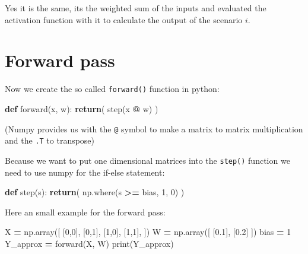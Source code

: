 \documentclass[
]{book}
\newenvironment{Shaded}{\begin{snugshade}}{\end{snugshade}}
\newcommand{\BuiltInTok}[1]{#1}
\newcommand{\ControlFlowTok}[1]{\textcolor[rgb]{0.13,0.29,0.53}{\textbf{#1}}}
\newcommand{\DecValTok}[1]{\textcolor[rgb]{0.00,0.00,0.81}{#1}}
\newcommand{\FloatTok}[1]{\textcolor[rgb]{0.00,0.00,0.81}{#1}}
\newcommand{\KeywordTok}[1]{\textcolor[rgb]{0.13,0.29,0.53}{\textbf{#1}}}
\newcommand{\NormalTok}[1]{#1}
\newcommand{\OperatorTok}[1]{\textcolor[rgb]{0.81,0.36,0.00}{\textbf{#1}}}
\begin{document}
Yes it is the same, its the weighted sum of the inputs and evaluated the activation function with it to calculate the output of the scenario \(i\).

\hypertarget{forward-pass}{%
\section{Forward pass}\label{forward-pass}}

Now we create the so called \texttt{forward()} function in python:

\begin{Shaded}
\begin{Highlighting}[]
\KeywordTok{def}\NormalTok{ forward(x, w):}
  \ControlFlowTok{return}\NormalTok{( step(x }\OperatorTok{@}\NormalTok{ w) )}
\end{Highlighting}
\end{Shaded}

(Numpy provides us with the \texttt{@} symbol to make a matrix to matrix multiplication and the \texttt{.T} to transpose)

Because we want to put one dimensional matrices into the \texttt{step()} function we need to use numpy for the if-else statement:

\begin{Shaded}
\begin{Highlighting}[]
\KeywordTok{def}\NormalTok{ step(s):}
  \ControlFlowTok{return}\NormalTok{( np.where(s }\OperatorTok{\textgreater{}=}\NormalTok{ bias, }\DecValTok{1}\NormalTok{, }\DecValTok{0}\NormalTok{) )}
\end{Highlighting}
\end{Shaded}

Here an small example for the forward pass:

\begin{Shaded}
\begin{Highlighting}[]
\NormalTok{X }\OperatorTok{=}\NormalTok{ np.array([}
\NormalTok{  [}\DecValTok{0}\NormalTok{,}\DecValTok{0}\NormalTok{],}
\NormalTok{  [}\DecValTok{0}\NormalTok{,}\DecValTok{1}\NormalTok{],}
\NormalTok{  [}\DecValTok{1}\NormalTok{,}\DecValTok{0}\NormalTok{],}
\NormalTok{  [}\DecValTok{1}\NormalTok{,}\DecValTok{1}\NormalTok{],}
\NormalTok{])}
\NormalTok{W }\OperatorTok{=}\NormalTok{ np.array([}
\NormalTok{  [}\FloatTok{0.1}\NormalTok{], }
\NormalTok{  [}\FloatTok{0.2}\NormalTok{]}
\NormalTok{])}
\NormalTok{bias }\OperatorTok{=} \DecValTok{1}
\NormalTok{Y\_approx }\OperatorTok{=}\NormalTok{ forward(X, W)}
\BuiltInTok{print}\NormalTok{(Y\_approx)}
\end{Highlighting}
\end{Shaded}
\end{document}
